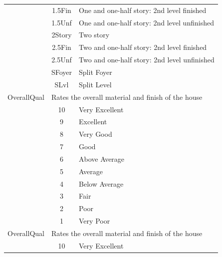 \documentclass[11pt]{scrartcl} %
\begin{document}
\begin{center}
\begin{tabular}{c c c c c c}
\multicolumn{2}{|c}{} & \multicolumn{1}{c}{1.5Fin} & \multicolumn{3}{l|}{One and one-half story: 2nd level finished}\\
\multicolumn{2}{|c}{} & \multicolumn{1}{c}{1.5Unf} & \multicolumn{3}{l|}{One and one-half story: 2nd level unfinished}\\
\multicolumn{2}{|c}{} & \multicolumn{1}{c}{2Story} & \multicolumn{3}{l|}{Two story}\\
\multicolumn{2}{|c}{} & \multicolumn{1}{c}{2.5Fin} & \multicolumn{3}{l|}{Two and one-half story: 2nd level finished}\\
\multicolumn{2}{|c}{} & \multicolumn{1}{c}{2.5Unf} & \multicolumn{3}{l|}{Two and one-half story: 2nd level unfinished}\\
\multicolumn{2}{|c}{} & \multicolumn{1}{c}{SFoyer} & \multicolumn{3}{l|}{Split Foyer}\\
\multicolumn{2}{|c}{} & \multicolumn{1}{c}{SLvl} & \multicolumn{3}{l|}{Split Level}\\
\hline
\multicolumn{2}{|c}{OverallQual} & \multicolumn{4}{l|}{Rates the overall material and finish of the house}\\ 
\multicolumn{2}{|c}{} & \multicolumn{1}{c}{10} & \multicolumn{3}{l|}{Very Excellent}\\
\multicolumn{2}{|c}{} & \multicolumn{1}{c}{9} & \multicolumn{3}{l|}{Excellent}\\
\multicolumn{2}{|c}{} & \multicolumn{1}{c}{8} & \multicolumn{3}{l|}{Very Good}\\
\multicolumn{2}{|c}{} & \multicolumn{1}{c}{7} & \multicolumn{3}{l|}{Good}\\
\multicolumn{2}{|c}{} & \multicolumn{1}{c}{6} & \multicolumn{3}{l|}{Above Average}\\
\multicolumn{2}{|c}{} & \multicolumn{1}{c}{5} & \multicolumn{3}{l|}{Average}\\
\multicolumn{2}{|c}{} & \multicolumn{1}{c}{4} & \multicolumn{3}{l|}{Below Average}\\
\multicolumn{2}{|c}{} & \multicolumn{1}{c}{3} & \multicolumn{3}{l|}{Fair}\\
\multicolumn{2}{|c}{} & \multicolumn{1}{c}{2} & \multicolumn{3}{l|}{Poor}\\
\multicolumn{2}{|c}{} & \multicolumn{1}{c}{1} & \multicolumn{3}{l|}{Very Poor}\\
\hline
\multicolumn{2}{|c}{OverallQual} & \multicolumn{4}{l|}{Rates the overall material and finish of the house}\\ 
\multicolumn{2}{|c}{} & \multicolumn{1}{c}{10} & \multicolumn{3}{l|}{Very Excellent}\\

\end{tabular}
\end{center}
\end{document}

